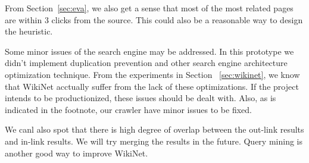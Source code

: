 \documentclass[12pt]{amsart}
\newcommand{\0}{\mat{0}}
\newcommand{\1}{\mathds{1}}
\begin{document}
From Section~\ref{sec:eva}, we also get a sense that most of the most related pages are within $3$ clicks from the source. This could also be a reasonable way to design the heuristic. 

Some minor issues of the search engine may be addressed. In this prototype we didn't implement duplication prevention and other search engine architecture optimization technique. From the experiments in Section ~\ref{sec:wikinet}, we know that WikiNet acctually suffer from the lack of these optimizations.  If the project intends to be productionized, these issues should be dealt with. Also, as is indicated in the footnote, our crawler have minor issues to be fixed. 

We canl also spot that there is high degree of overlap between the out-link results and in-link results. We will try merging the results in the future. Query mining is another good way to improve WikiNet. 


 

\end{document}
